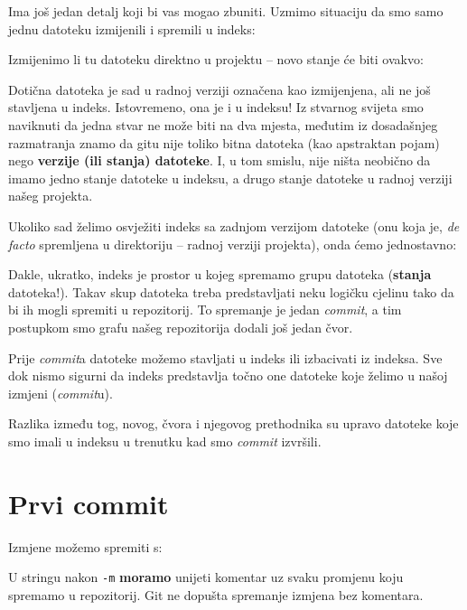 Ima još jedan detalj koji bi vas mogao zbuniti. 
Uzmimo situaciju da smo samo jednu datoteku izmijenili i spremili u indeks:



Izmijenimo li tu datoteku direktno u projektu -- novo stanje će biti ovakvo:



Dotična datoteka je sad u radnoj verziji označena kao izmijenjena, ali ne još stavljena u indeks.
Istovremeno, ona je i u indeksu!
Iz stvarnog svijeta smo naviknuti da jedna stvar ne može biti na dva mjesta, međutim iz dosadašnjeg razmatranja znamo da gitu nije toliko bitna datoteka (kao apstraktan pojam) nego \textbf{verzije (ili stanja) datoteke}.
I, u tom smislu, nije ništa neobično da imamo jedno stanje datoteke u indeksu, a drugo stanje datoteke u radnoj verziji našeg projekta.

Ukoliko sad želimo osvježiti indeks sa zadnjom verzijom datoteke (onu koja je, \emph{de facto} spremljena u direktoriju -- radnoj verziji projekta), onda ćemo jednostavno:


Dakle, ukratko, indeks je prostor u kojeg spremamo grupu datoteka (\textbf{stanja} datoteka!).
Takav skup datoteka treba predstavljati neku logičku cjelinu tako da bi ih mogli spremiti u repozitorij.
To spremanje je jedan \emph{commit}, a tim postupkom smo grafu našeg repozitorija dodali još jedan čvor. 

Prije \emph{commit}a datoteke možemo stavljati u indeks ili izbacivati iz indeksa.
Sve dok nismo sigurni da indeks predstavlja točno one datoteke koje želimo u našoj izmjeni (\emph{commit}u).

Razlika između tog, novog, čvora i njegovog prethodnika su upravo datoteke koje smo imali u indeksu u trenutku kad smo \emph{commit} izvršili.

\section*{Prvi commit}

Izmjene možemo spremiti s:


U stringu nakon \verb+-m+ \textbf{moramo} unijeti komentar uz svaku promjenu koju spremamo u repozitorij.
Git ne dopušta spremanje izmjena bez komentara.

